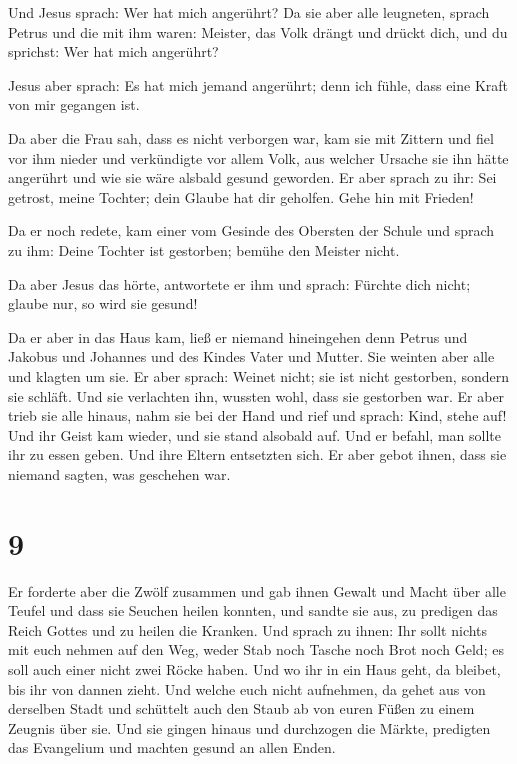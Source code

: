  Und Jesus sprach: Wer hat mich angerührt? Da sie aber
alle leugneten, sprach Petrus und die mit ihm waren: Meister, das Volk
drängt und drückt dich, und du sprichst: Wer hat mich angerührt?

 Jesus aber sprach: Es hat mich jemand angerührt; denn
ich fühle, dass eine Kraft von mir gegangen ist.

 Da aber die Frau sah, dass es nicht verborgen war, kam
sie mit Zittern und fiel vor ihm nieder und verkündigte vor allem Volk,
aus welcher Ursache sie ihn hätte angerührt und wie sie wäre alsbald
gesund geworden.  Er aber sprach zu ihr: Sei getrost,
meine Tochter; dein Glaube hat dir geholfen. Gehe hin mit Frieden!

 Da er noch redete, kam einer vom Gesinde des Obersten
der Schule und sprach zu ihm: Deine Tochter ist gestorben; bemühe den
Meister nicht.

 Da aber Jesus das hörte, antwortete er ihm und sprach:
Fürchte dich nicht; glaube nur, so wird sie gesund!

 Da er aber in das Haus kam, ließ er niemand hineingehen
denn Petrus und Jakobus und Johannes und des Kindes Vater und Mutter.
 Sie weinten aber alle und klagten um sie. Er aber
sprach: Weinet nicht; sie ist nicht gestorben, sondern sie schläft.
 Und sie verlachten ihn, wussten wohl, dass sie gestorben
war.  Er aber trieb sie alle hinaus, nahm sie bei der
Hand und rief und sprach: Kind, stehe auf!  Und ihr Geist
kam wieder, und sie stand alsobald auf. Und er befahl, man sollte ihr zu
essen geben.  Und ihre Eltern entsetzten sich. Er aber
gebot ihnen, dass sie niemand sagten, was geschehen war.

\hypertarget{section-8}{%
\section{9}\label{section-8}}

 Er forderte aber die Zwölf zusammen und gab ihnen Gewalt
und Macht über alle Teufel und dass sie Seuchen heilen konnten,
 und sandte sie aus, zu predigen das Reich Gottes und zu
heilen die Kranken.  Und sprach zu ihnen: Ihr sollt nichts
mit euch nehmen auf den Weg, weder Stab noch Tasche noch Brot noch Geld;
es soll auch einer nicht zwei Röcke haben.  Und wo ihr in
ein Haus geht, da bleibet, bis ihr von dannen zieht.  Und
welche euch nicht aufnehmen, da gehet aus von derselben Stadt und
schüttelt auch den Staub ab von euren Füßen zu einem Zeugnis über sie.
 Und sie gingen hinaus und durchzogen die Märkte,
predigten das Evangelium und machten gesund an allen Enden.

